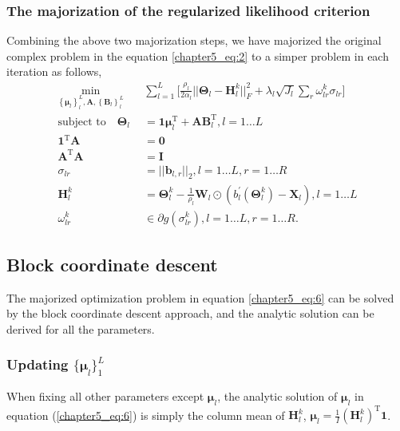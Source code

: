 \subsubsection*{The majorization of the regularized likelihood criterion}
Combining the above two majorization steps, we have majorized the original complex problem in the equation \ref{chapter5_eq:2} to a simper problem in each iteration as follows,
\begin{equation}\label{chapter5_eq:6}
\begin{aligned}
    \min_{ \left\{\bm{\mu}_l\right\}_{l}^{L}, \mathbf{A}, \left\{\mathbf{B}_l\right\}_{l}^{L}} \quad & \sum_{l=1}^{L}\Big[ \frac{\rho_l}{2\alpha_l} ||\mathbf{\Theta}_l - \mathbf{H}_{l}^{k}||_F^2  + \lambda_l \sqrt{J_l} \sum_{r} \omega_{lr}^k \sigma_{lr} \Big] \\
    \text{subject to} \quad \mathbf{\Theta}_l &= \mathbf{1}\bm{\mu}_l^{\text{T}} + \mathbf{AB}_l^{\text{T}}, l = 1 \ldots L \\
     \mathbf{1}^{\text{T}}\mathbf{A} &= \mathbf{0}\\
	 \mathbf{A}^{\text{T}}\mathbf{A} &= \mathbf{I} \\
	 \sigma_{lr} &= ||\mathbf{b}_{l,r}||_2, l = 1 \ldots L, r = 1 \ldots R\\
\mathbf{H}_{l}^{k} &= \mathbf{\Theta}_l^k - \frac{1}{\rho_l} \mathbf{W}_l \odot (b_l^{'}(\mathbf{\Theta}_{l}^{k}) - \mathbf{X}_l), l = 1 \ldots L \\
\omega_{lr}^k &\in \partial g(\sigma_{lr}^k), l = 1 \ldots L, r = 1 \ldots R.
\end{aligned}
\end{equation}

\subsection{Block coordinate descent}
The majorized optimization problem in equation \ref{chapter5_eq:6} can be solved by the block coordinate descent approach, and the analytic solution can be derived for all the parameters.

\subsubsection*{Updating $\{ \bm{\mu}_l \}_{1}^{L}$}
When fixing all other parameters except $\bm{\mu}_l$, the analytic solution of $\bm{\mu}_l$ in equation (\ref{chapter5_eq:6}) is simply the column mean of $\mathbf{H}_l^k$, $\bm{\mu}_l = \frac{1}{I} (\mathbf{H}_l^k)^{\text{T}} \mathbf{1}$.

